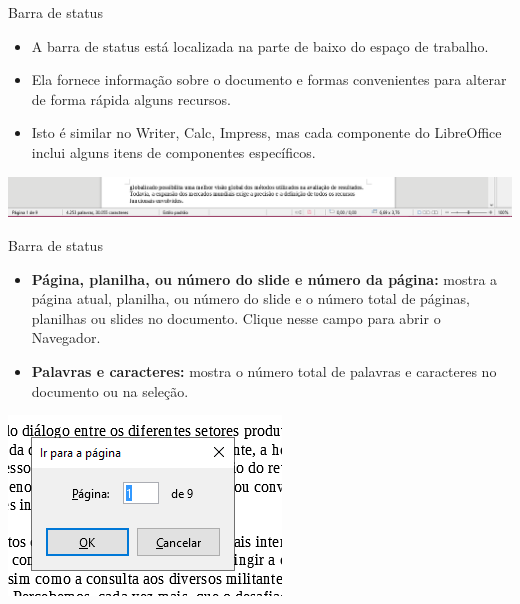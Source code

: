 \begin{frame}{Barra de status}
	\begin{block}{}
		\begin{itemize}
			\item A barra de status está localizada na parte de baixo do espaço de trabalho.
			\item Ela fornece informação sobre o documento e formas convenientes para alterar de forma rápida alguns recursos.
			\item Isto é similar no Writer, Calc, Impress, mas cada componente do LibreOffice inclui alguns itens de componentes específicos.
		\end{itemize}
	\end{block}

	\bigskip

	\centering
	\includegraphics[width=1\linewidth]{Figuras/Ch04/fig19}
\end{frame}


\begin{frame}{Barra de status}
	\begin{block}{}
		\begin{itemize}
			\item \textbf{Página, planilha, ou número do slide e número da página:} mostra a página atual, planilha, ou número do slide e o número total de páginas, planilhas ou slides no documento. Clique nesse campo para abrir o Navegador.
			\item \textbf{Palavras e caracteres:} mostra o número total de palavras e caracteres no documento ou na seleção.
		\end{itemize}
	\end{block}

	\centering
	\includegraphics[width=0.55\linewidth]{Figuras/Ch04/fig20}
\end{frame}


